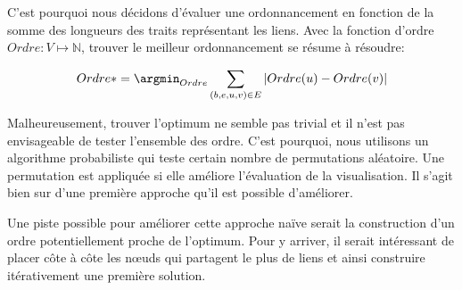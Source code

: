 C'est pourquoi nous décidons d'évaluer une ordonnancement en fonction de la somme des longueurs des traits représentant les liens.
Avec la fonction d'ordre $Ordre: V \longmapsto \mathbb{N}$, trouver le meilleur ordonnancement se résume à résoudre:

\begin{equation}
 Ordre* = \argmin_{Ordre}  \sum_{(b,e,u,v) \in E} |Ordre(u)- Ordre(v)|
\end{equation}

Malheureusement, trouver l'optimum ne semble pas trivial et il n'est pas envisageable de tester l'ensemble des ordre.
C'est pourquoi, nous utilisons un algorithme probabiliste qui teste certain nombre de permutations aléatoire.
Une permutation est appliquée si elle améliore l'évaluation de la visualisation.
Il s'agit bien sur d'une première approche qu'il est possible d'améliorer.

Une piste possible pour améliorer cette approche naïve serait la construction d'un ordre potentiellement proche de l'optimum.
Pour y arriver, il serait intéressant de placer côte à côte les n\oe uds qui partagent le plus de liens et ainsi construire itérativement une première solution.